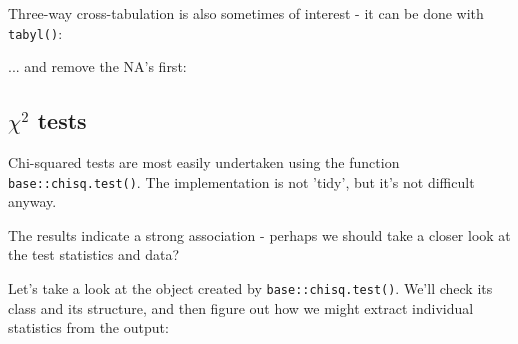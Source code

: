 \documentclass[titlepage]{book}\usepackage{knitr}
\begin{document}
Three-way cross-tabulation is also sometimes of interest - it can be done with \texttt{tabyl()}:

\begin{knitrout}
\color{fgcolor}
\end{knitrout}
... and  remove the NA's first:

\begin{knitrout}
\color{fgcolor}
\end{knitrout}

\subsection{$\chi^2$ tests} 

Chi-squared tests are most easily undertaken using the function \texttt{base::chisq.test()}.  The implementation is not 'tidy', but it's not difficult anyway.

\begin{knitrout}
\color{fgcolor}\begin{kframe}
\begin{alltt}
 \hlkwb{<-} \hlopt{$}\hlopt{$}
\end{alltt}
\end{kframe}
\end{knitrout}
The results indicate a strong association - perhaps we should take a closer look at the test statistics and data?

Let's take a look at the object created by \texttt{base::chisq.test()}.  We'll check its class and its structure, and then figure out how we might extract individual statistics from the output:
\end{document}
